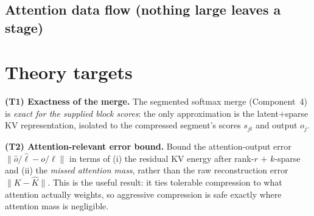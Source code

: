 \documentclass[11pt]{article}
\newcommand{\norm}[1]{\lVert #1 \rVert}
\begin{document}
\subsection{Attention data flow (nothing large leaves a stage)}
\begin{center}
\end{center}

\section{Theory targets}

\begin{theorybox}
\textbf{(T1) Exactness of the merge.} The segmented softmax merge (Component~4) is
\emph{exact for the supplied block scores}: the only approximation is the latent$+$sparse KV
representation, isolated to the compressed segment's scores $s_{jt}$ and output $o_j$.
\end{theorybox}

\begin{theorybox}
\textbf{(T2) Attention-relevant error bound.} Bound the attention-output error
$\norm{\hat o/\hat\ell - o/\ell}$ in terms of (i) the residual KV energy after rank-$r$ $+$
$k$-sparse and (ii) the \emph{missed attention mass}, rather than the raw reconstruction error
$\norm{K-\hat K}$. This is the useful result: it ties tolerable compression to what attention
actually weights, so aggressive compression is safe exactly where attention mass is negligible.
\end{theorybox}
\end{document}
